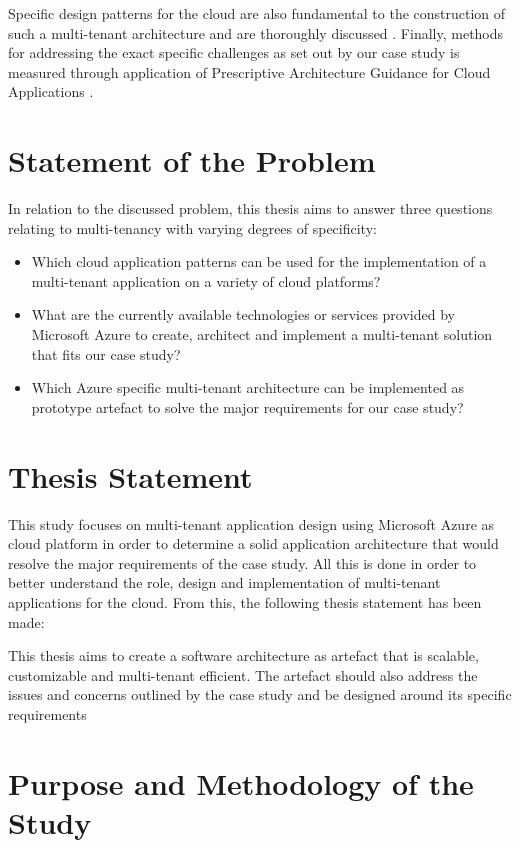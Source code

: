 Specific design patterns for the cloud are also fundamental to the construction of such a multi-tenant architecture and are thoroughly discussed \cite{Wilder2012-so}. Finally, methods for addressing the exact specific challenges as set out by our case study is measured through application of Prescriptive Architecture Guidance for Cloud Applications \cite{Homer2014}. 

\section{Statement of the Problem}
In relation to the discussed problem, this thesis aims to answer three questions relating to multi-tenancy with varying degrees of specificity:
\begin{itemize}
\item Which cloud application patterns can be used for the implementation of a multi-tenant application on a variety of cloud platforms?
\item What are the currently available technologies or services provided by Microsoft Azure to create, architect and implement a multi-tenant solution that fits our case study?
\item Which Azure specific multi-tenant architecture can be implemented as prototype  artefact to solve the major requirements for our case study?
\end{itemize}

\section{Thesis Statement}
This study focuses on multi-tenant application design using Microsoft Azure as cloud platform in order to determine a solid application architecture that would resolve the major requirements of the case study. All this is done in order to better understand the role, design and implementation of multi-tenant applications for the cloud. From this, the following thesis statement has been made:
 
\begin{fancyquotes}
This thesis aims to create a software architecture as artefact that is scalable, customizable and multi-tenant efficient. The artefact should also address the issues and concerns outlined by the case study and be designed around its specific requirements
\end{fancyquotes}

\section{Purpose and Methodology of the Study}

